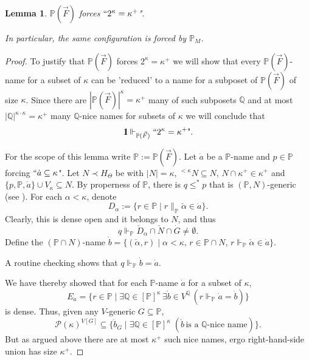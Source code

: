 \documentclass[11pt]{amsart}
\newtheorem{lemma}[theorem]{Lemma}
\theoremstyle{definition}
\theoremstyle{remark}
\def\s{\subseteq}
\def\forces{\Vdash}
\newcommand{\one}{\mathop{1\hskip-3pt {\rm l}}}
\newcommand\tom[1]{\marginpar{Tom: #1}}
\newcommand\ale[1]{\marginpar{Alejandro: #1}}
\begin{document}
 \begin{lemma}\label{lemma: power function}%
     $\mathbb{P}(\vec{F})$ forces $``2^\kappa=\kappa^+$". 
     
     In particular, the same configuration is forced by $\mathbb{P}_M$.
 \end{lemma}
 \begin{proof}
  To justify that $\mathbb{P}(\vec{F})$ forces $2^\kappa=\kappa^+$ we will show that every $\mathbb{P}(\vec{F})$-name for a subset of $\kappa$ can be 'reduced' to a name for a subposet of $\mathbb{P}(\vec{F})$ of size $\kappa$. Since there are  $|\mathbb{P}(\vec{F})|^\kappa=\kappa^+$ many of such subposets $\mathbb{Q}$ and at most $|\mathbb{Q}|^{\kappa\cdot\kappa}=\kappa^+$ many $\mathbb{Q}$-nice names for subsets of $\kappa$ we will conclude that $$\one\forces_{\mathbb{P}(\vec{F})}\text{$`` 2^\kappa=\kappa^+$"}.$$

    For the scope of this  lemma write $\mathbb{P}:=\mathbb{P}(\vec{F})$. Let $\dot{a}$ be a $\mathbb{P}$-name and $p\in \mathbb{P}$ forcing $``\dot{a}\s \kappa$". Let $N\prec H_\Theta$ be with $|N|=\kappa$, ${}^{<\kappa} N\s N$, $N\cap \kappa^+\in \kappa^+$ and $\{p,\mathbb{P},\dot{a}\}\cup V_\kappa\s N$. By properness of $\mathbb{P}$, there is $q\leq^* p$ that is $(\mathbb{P},N)$-generic (see \cite[Lemma 4.13]{Merimovich}). For each $\alpha < \kappa$, denote $$D_\alpha :=\{r\in \mathbb{P}\mid r\parallel_{\mathbb{P}}\check{\alpha}\in\dot{a}\}.$$
    Clearly, this is dense open and it belongs to $N$, and thus $$q\forces_{\mathbb{P}} \check{D}_\alpha\cap \check{N}\cap \dot{G}\neq \emptyset.$$
   Define the $(\mathbb{P}\cap N)$-name $\dot{b}=\{(\check{\alpha},r)\mid \alpha <\kappa,\,r\in \mathbb{P}\cap N,\, r\forces_{\mathbb{P}}\check{\alpha}\in \dot{a}\}$.

  A routine checking shows that   $q\forces_{\mathbb{P}}\dot{b}=\dot{a}$.

   \smallskip

   We have thereby showed that for each $\mathbb{P}$-name $\dot{a}$ for a subset of $\kappa$,
   $$E_{\dot{a}}=\{r\in \mathbb{P}\mid \exists \mathbb{Q}\in [\mathbb{P}]^{\kappa}\,\exists \dot{b}\in V^{\mathbb{Q}}\, (r\forces_{\mathbb{P}}\dot{a}=\dot{b})\}$$
   is dense. Thus, given any $V$-generic $G\s \mathbb{P}$, $$\mathcal{P}(\kappa)^{V[G]} \s \{\dot{b}_G\mid \exists \mathbb{Q}\in [\mathbb{P}]^{\kappa}\;(\dot{b}\, \text{is a $\mathbb{Q}$-nice name})\}.$$
   But as argued above there are at most $\kappa^+$ such nice names, ergo right-hand-side union has size $\kappa^+$.
 \end{proof}
\end{document}
